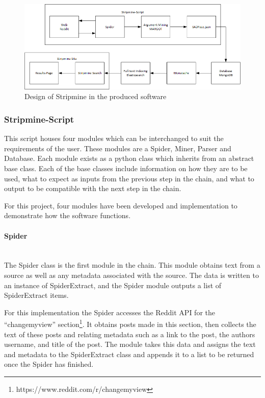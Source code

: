 \documentclass[12pt,a4paper]{article}
\begin{document}
\begin{figure}[H]
    \centering
    \includegraphics[scale=0.66]{Report/graphics/newdesign.png}
    \caption{Design of Stripmine in the produced software}
    \label{fig:newdesign}
\end{figure}

\subsubsection{Stripmine-Script}

This script houses four modules which can be interchanged to suit the requirements of the user. These modules are a Spider, Miner, Parser and Database. Each module exists as a python class which inherits from an abstract base class. Each of the base classes include information on how they are to be used, what to expect as inputs from the previous step in the chain, and what to output to be compatible with the next step in the chain. 

For this project, four modules have been developed and implementation to demonstrate how the software functions.

\paragraph{Spider}\mbox{}\\

The Spider class is the first module in the chain. This module obtains text from a source as well as any metadata associated with the source. The data is written to an instance of SpiderExtract, and the Spider module outputs a list of SpiderExtract items.

For this implementation the Spider accesses the Reddit API for the ``changemyview'' section\footnote{https://www.reddit.com/r/changemyview}. It obtains posts made in this section, then collects the text of these posts and relating metadata such as a link to the post, the authors username, and title of the post. The module takes this data and assigns the text and metadata to the SpiderExtract class and appends it to a list to be returned once the Spider has finished. 
\end{document}
